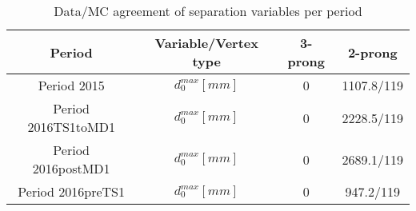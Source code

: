 \documentclass{article}
\begin{document}
\begin{longtable}{c|c|c|c}
\caption{\label{tab:sepVarsandSepPeriods}Data/MC agreement of separation variables per period}\\
Period & Variable/Vertex type & 3-prong & 2-prong\\
\hline
 Period 2015 & $d_{0}^{max} [mm]$ & 0 & 1107.8/119\\
\hline
 Period 2016TS1toMD1 & $d_{0}^{max} [mm]$ & 0 & 2228.5/119\\
\hline
 Period 2016postMD1 & $d_{0}^{max} [mm]$ & 0 & 2689.1/119\\
\hline
 Period 2016preTS1 & $d_{0}^{max} [mm]$ & 0 & 947.2/119\\
\hline
\end{longtable}
\end{document}
